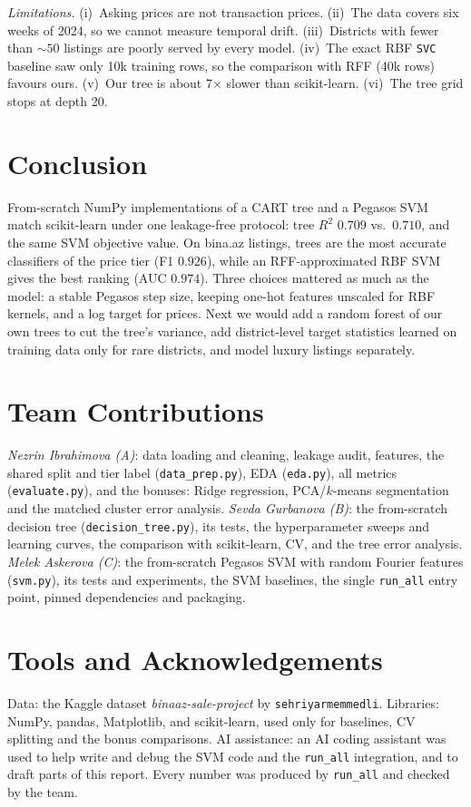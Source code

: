 \documentclass[10pt,twocolumn,a4paper]{article}
\begin{document}
\emph{Limitations.} (i)~Asking prices are not transaction prices.
(ii)~The data covers six weeks of 2024, so we cannot measure temporal
drift. (iii)~Districts with fewer than ${\sim}50$ listings are poorly
served by every model. (iv)~The exact RBF \texttt{SVC} baseline saw only
10k training rows, so the comparison with RFF (40k rows) favours ours.
(v)~Our tree is about 7$\times$ slower than scikit-learn. (vi)~The tree
grid stops at depth 20.

\section{Conclusion}
From-scratch NumPy implementations of a CART tree and a Pegasos SVM
match scikit-learn under one leakage-free protocol: tree $R^2$
$0.709$ vs.\ $0.710$, and the same SVM objective value. On bina.az
listings, trees are the most accurate classifiers of the price tier
(F1 $0.926$), while an RFF-approximated RBF SVM gives the best ranking
(AUC $0.974$). Three choices mattered as much as the model: a stable
Pegasos step size, keeping one-hot features unscaled for RBF kernels, and
a log target for prices. Next we would add a random forest of our own
trees to cut the tree's variance, add district-level target statistics
learned on training data only for rare districts, and model luxury
listings separately.

\section*{Team Contributions}
\emph{Nezrin Ibrahimova (A)}: data loading and cleaning, leakage audit,
features, the shared split and tier label (\texttt{data\_prep.py}),
EDA (\texttt{eda.py}), all metrics (\texttt{evaluate.py}), and the
bonuses: Ridge regression, PCA/$k$-means segmentation and the matched
cluster error analysis.
\emph{Sevda Gurbanova (B)}: the from-scratch decision tree
(\texttt{decision\_tree.py}), its tests, the hyperparameter sweeps and
learning curves, the comparison with scikit-learn, CV, and the tree
error analysis.
\emph{Melek Askerova (C)}: the from-scratch Pegasos SVM with random
Fourier features (\texttt{svm.py}), its tests and experiments, the SVM
baselines, the single \texttt{run\_all} entry point, pinned dependencies
and packaging.

\section*{Tools and Acknowledgements}
Data: the Kaggle dataset \emph{binaaz-sale-project} by
\texttt{sehriyarmemmedli}. Libraries: NumPy, pandas, Matplotlib, and
scikit-learn, used only for baselines, CV splitting and the bonus
comparisons. AI assistance: an AI coding assistant was used to help
write and debug the SVM code and the \texttt{run\_all} integration, and
to draft parts of this report. Every number was produced by
\texttt{run\_all} and checked by the team.
\end{document}

